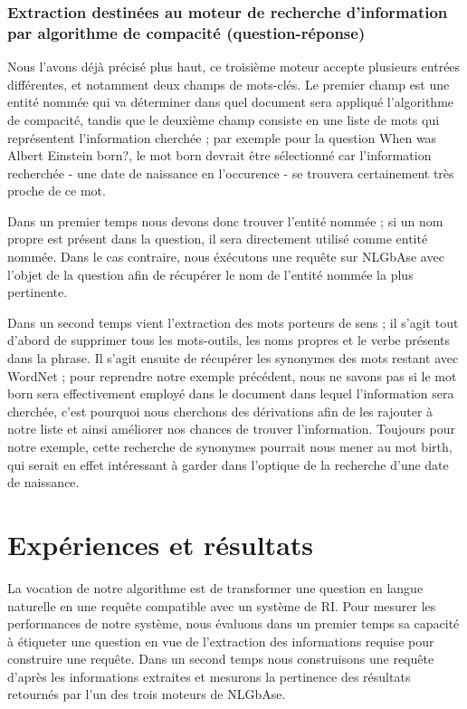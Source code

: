 \documentclass[10pt,a4paper]{article}
\begin{document}
\subsubsection{Extraction destinées au moteur de recherche d'information par algorithme de compacité (question-réponse)}
\par Nous l'avons déjà précisé plus haut, ce troisième moteur accepte plusieurs entrées différentes, et notamment deux champs de mots-clés. Le premier champ est une entité nommée qui va déterminer dans quel document sera appliqué l'algorithme de compacité, tandis que le deuxième champ consiste en une liste de mots qui représentent l'information cherchée ; par exemple pour la question \og{}When was Albert Einstein born?\fg{}, le mot \og{}born\fg{} devrait être sélectionné car l'information recherchée - une date de naissance en l'occurence - se trouvera certainement très proche de ce mot.
\par Dans un premier temps nous devons donc trouver l'entité nommée ; si un nom propre est présent dans la question, il sera directement utilisé comme entité nommée. Dans le cas contraire, nous éxécutons une requête sur NLGbAse avec l'objet de la question afin de récupérer le nom de l'entité nommée la plus pertinente. 
\par Dans un second temps vient l'extraction des mots porteurs de sens ; il s'agit tout d'abord de supprimer tous les mots-outils, les noms propres et le verbe présents dans la phrase. Il s'agit ensuite de récupérer les synonymes des mots restant avec WordNet ; pour reprendre notre exemple précédent, nous ne savons pas si le mot \og{}born\fg{} sera effectivement employé dans le document dans lequel l'information sera cherchée, c'est pourquoi nous cherchons des dérivations afin de les rajouter à notre liste et ainsi améliorer nos chances de trouver l'information. Toujours pour notre exemple, cette recherche de synonymes pourrait nous mener au mot \og{}birth\fg{}, qui serait en effet intéressant à garder dans l'optique de la recherche d'une date de naissance.


\section{Expériences et résultats}\label{expériences}

\par La vocation de notre algorithme est de transformer une question en langue naturelle en une requête compatible avec un système de RI.  Pour mesurer les performances de notre système, nous évaluons dans un premier temps sa capacité à étiqueter une question en vue de l'extraction des informations requise pour construire une requête. Dans un second temps nous construisons une requête d'après les informations extraites et mesurons la pertinence des résultats retournés par l'un des trois moteurs de NLGbAse.
\end{document}
